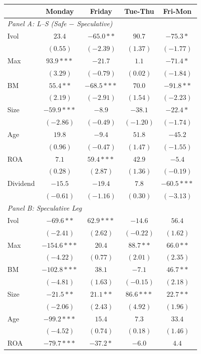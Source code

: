 \centering
\footnotesize
\begin{tabular}{l c c c c}
\toprule
 & Monday & Friday & Tue-Thu & Fri-Mon \\
\midrule
\multicolumn{5}{l}{\textit{Panel A: L--S (Safe $-$ Speculative)}} \\
Ivol & $23.4$ & $-65.0**$ & $90.7$ & $-75.3*$ \\
 & $(0.55)$ & $(-2.39)$ & $(1.37)$ & $(-1.77)$ \\
Max & $93.9***$ & $-21.7$ & $1.1$ & $-71.4*$ \\
 & $(3.29)$ & $(-0.79)$ & $(0.02)$ & $(-1.84)$ \\
BM & $55.4**$ & $-68.5***$ & $70.0$ & $-91.8**$ \\
 & $(2.19)$ & $(-2.91)$ & $(1.54)$ & $(-2.23)$ \\
Size & $-59.9***$ & $-8.9$ & $-38.1$ & $-22.4*$ \\
 & $(-2.86)$ & $(-0.49)$ & $(-1.20)$ & $(-1.74)$ \\
Age & $19.8$ & $-9.4$ & $51.8$ & $-45.2$ \\
 & $(0.96)$ & $(-0.47)$ & $(1.47)$ & $(-1.55)$ \\
ROA & $7.1$ & $59.4***$ & $42.9$ & $-5.4$ \\
 & $(0.28)$ & $(2.87)$ & $(1.36)$ & $(-0.19)$ \\
Dividend & $-15.5$ & $-19.4$ & $7.8$ & $-60.5***$ \\
 & $(-0.61)$ & $(-1.16)$ & $(0.30)$ & $(-3.13)$ \\
\midrule
\multicolumn{5}{l}{\textit{Panel B: Speculative Leg}} \\
Ivol & $-69.6**$ & $62.9***$ & $-14.6$ & $56.4$ \\
 & $(-2.41)$ & $(2.62)$ & $(-0.22)$ & $(1.62)$ \\
Max & $-154.6***$ & $20.4$ & $88.7**$ & $66.0**$ \\
 & $(-4.22)$ & $(0.77)$ & $(2.01)$ & $(2.35)$ \\
BM & $-102.8***$ & $38.1$ & $-7.1$ & $46.7**$ \\
 & $(-4.81)$ & $(1.63)$ & $(-0.15)$ & $(2.18)$ \\
Size & $-21.5**$ & $21.1**$ & $86.6***$ & $22.7**$ \\
 & $(-2.06)$ & $(2.43)$ & $(4.92)$ & $(1.96)$ \\
Age & $-99.2***$ & $15.4$ & $7.3$ & $33.4$ \\
 & $(-4.52)$ & $(0.74)$ & $(0.18)$ & $(1.46)$ \\
ROA & $-79.7***$ & $-37.2*$ & $-6.0$ & $4.4$ \\

\end{tabular}
